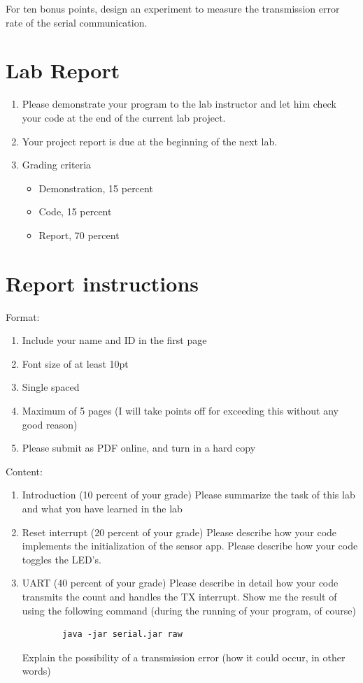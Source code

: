\documentclass[letterpaper,12pt]{article}
\begin{document}
For ten bonus points, design an experiment to measure the transmission error rate of the serial
communication.

\section*{Lab Report}
\begin{enumerate}
   \item Please demonstrate your program to the lab instructor and let him check your code at the end of the current lab project.
   \item Your project report is due at the beginning of the next lab.
   \item Grading criteria
      \begin{itemize}
         \item Demonstration, 15 percent
         \item Code, 15 percent
         \item Report, 70 percent
      \end{itemize}
\end{enumerate}
\section*{Report instructions}
Format:
\begin{enumerate}
   \item Include your name and ID in the first page
   \item Font size of at least 10pt
   \item Single spaced
   \item Maximum of 5 pages (I will take points off for exceeding this without any good reason)
   \item Please submit as PDF online, and turn in a hard copy
\end{enumerate}
Content:
\begin{enumerate}
   \item Introduction (10 percent of your grade) Please summarize the task of this lab and what you have learned in the lab
   \item Reset interrupt (20 percent of your grade) Please describe how your code implements the initialization of the sensor app.
        Please describe how your code toggles the LED's.
    \item UART (40 percent of your grade) Please describe in detail how your code transmits the count and handles the TX interrupt.
        Show me the result of using the following command (during the running of your program, of course)
        \begin{lstlisting}
        java -jar serial.jar raw
        \end{lstlisting}
        Explain the possibility of a transmission error (how it could occur, in other words)
\end{enumerate}
\end{document}
